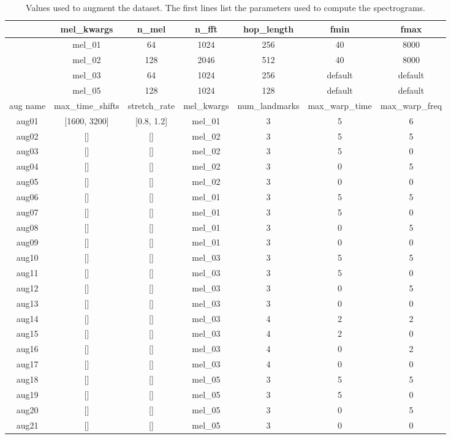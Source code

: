 \begin{table*}[h!]
    \centering
    \caption{Values used to augment the dataset. The first lines list the parameters used to compute the spectrograms.}
    \label{tab:aug_values}
    \begin{tabular}{|c|cccccc|}
        \hline
        & mel\_kwargs & n\_mel & n\_fft & hop\_length & fmin & fmax \\
        \hline
        \hline
        & mel\_01 & 64 & 1024 & 256 & 40 & 8000  \\
        & mel\_02 & 128 & 2046 & 512 & 40 & 8000  \\
        & mel\_03 & 64 & 1024 & 256 & default & default  \\
        & mel\_05 & 128 & 1024 & 128 & default & default  \\
        \hline
        \hline
        aug name & max\_time\_shifts & stretch\_rate & mel\_kwargs & num\_landmarks & max\_warp\_time & max\_warp\_freq\\
        \hline
        \hline
        aug01 &  [1600, 3200] & [0.8, 1.2] & mel\_01 & 3 & 5 & 6 \\
        \hline
        aug02 &  [] & [] & mel\_02 & 3 & 5 & 5 \\
        aug03 &  [] & [] & mel\_02 & 3 & 5 & 0 \\
        aug04 &  [] & [] & mel\_02 & 3 & 0 & 5 \\
        aug05 &  [] & [] & mel\_02 & 3 & 0 & 0 \\
        \hline
        aug06 &  [] & [] & mel\_01 & 3 & 5 & 5 \\
        aug07 &  [] & [] & mel\_01 & 3 & 5 & 0 \\
        aug08 &  [] & [] & mel\_01 & 3 & 0 & 5 \\
        aug09 &  [] & [] & mel\_01 & 3 & 0 & 0 \\
        \hline
        aug10 &  [] & [] & mel\_03 & 3 & 5 & 5 \\
        aug11 &  [] & [] & mel\_03 & 3 & 5 & 0 \\
        aug12 &  [] & [] & mel\_03 & 3 & 0 & 5 \\
        aug13 &  [] & [] & mel\_03 & 3 & 0 & 0 \\
        \hline
        aug14 &  [] & [] & mel\_03 & 4 & 2 & 2 \\
        aug15 &  [] & [] & mel\_03 & 4 & 2 & 0 \\
        aug16 &  [] & [] & mel\_03 & 4 & 0 & 2 \\
        aug17 &  [] & [] & mel\_03 & 4 & 0 & 0 \\
        \hline
        aug18 &  [] & [] & mel\_05 & 3 & 5 & 5 \\
        aug19 &  [] & [] & mel\_05 & 3 & 5 & 0 \\
        aug20 &  [] & [] & mel\_05 & 3 & 0 & 5 \\
        aug21 &  [] & [] & mel\_05 & 3 & 0 & 0 \\
        \hline
    \end{tabular}
\end{table*}
